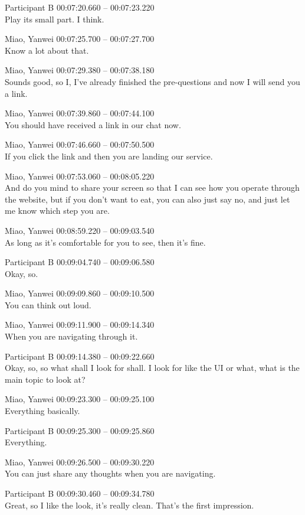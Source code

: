 {Participant B 00:07:20.660 -- 00:07:23.220 \\
Play its small part. I think.

Miao, Yanwei 00:07:25.700 -- 00:07:27.700 \\
Know a lot about that.

Miao, Yanwei 00:07:29.380 -- 00:07:38.180 \\
Sounds good, so I, I've already finished the pre-questions and now I will send you a link.

Miao, Yanwei 00:07:39.860 -- 00:07:44.100 \\
You should have received a link in our chat now.

Miao, Yanwei 00:07:46.660 -- 00:07:50.500 \\
If you click the link and then you are landing our service.

Miao, Yanwei 00:07:53.060 -- 00:08:05.220 \\
And do you mind to share your screen so that I can see how you operate through the website, but if you don't want to eat, you can also just say no, and just let me know which step you are.

Miao, Yanwei 00:08:59.220 -- 00:09:03.540 \\
As long as it's comfortable for you to see, then it's fine.

Participant B 00:09:04.740 -- 00:09:06.580 \\
Okay, so.

Miao, Yanwei 00:09:09.860 -- 00:09:10.500 \\
You can think out loud.

Miao, Yanwei 00:09:11.900 -- 00:09:14.340 \\
When you are navigating through it.

Participant B 00:09:14.380 -- 00:09:22.660 \\
Okay, so, so what shall I look for shall. I look for like the UI or what, what is the main topic to look at?

Miao, Yanwei 00:09:23.300 -- 00:09:25.100 \\
Everything basically.

Participant B 00:09:25.300 -- 00:09:25.860 \\
Everything.

Miao, Yanwei 00:09:26.500 -- 00:09:30.220 \\
You can just share any thoughts when you are navigating.

Participant B 00:09:30.460 -- 00:09:34.780 \\
Great, so I like the look, it's really clean. That's the first impression.

}

